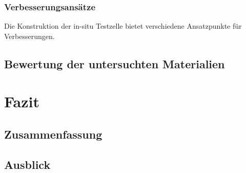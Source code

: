 \documentclass[a4paper, 11pt, headsepline,footsepline,twoside,abstract]{scrbook}
\begin{document}
\subsection{Verbesserungsansätze}
Die Konstruktion der in-situ Testzelle bietet verschiedene Ansatzpunkte für Verbesserungen.
\section{Bewertung der untersuchten Materialien} 
\chapter{Fazit}
\section{Zusammenfassung}
\section{Ausblick}
\renewcommand{\thesection}{\Alph{section}}

\cleardoublepage
{}
\listoffigures

\cleardoublepage
{}
\listoftables

\cleardoublepage
{}

 

\end{document}
